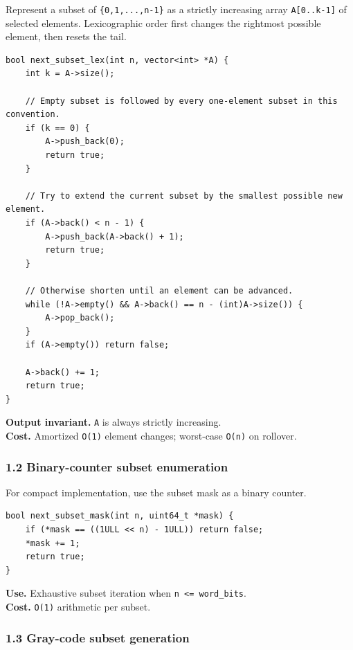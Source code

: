 \documentclass[11pt]{article}
\begin{document}
Represent a subset of \texttt{\{0,1,...,n-1\}} as a strictly increasing array \texttt{A[0..k-1]} of selected elements. Lexicographic order first changes the rightmost possible element, then resets the tail.

\begin{verbatim}
bool next_subset_lex(int n, vector<int> *A) {
    int k = A->size();

    // Empty subset is followed by every one-element subset in this convention.
    if (k == 0) {
        A->push_back(0);
        return true;
    }

    // Try to extend the current subset by the smallest possible new element.
    if (A->back() < n - 1) {
        A->push_back(A->back() + 1);
        return true;
    }

    // Otherwise shorten until an element can be advanced.
    while (!A->empty() && A->back() == n - (int)A->size()) {
        A->pop_back();
    }
    if (A->empty()) return false;

    A->back() += 1;
    return true;
}
\end{verbatim}

\textbf{Output invariant.} \texttt{A} is always strictly increasing.\\
\textbf{Cost.} Amortized \texttt{O(1)} element changes; worst-case \texttt{O(n)} on rollover.

\subsubsection{1.2 Binary-counter subset enumeration}\label{binary-counter-subset-enumeration}

For compact implementation, use the subset mask as a binary counter.

\begin{verbatim}
bool next_subset_mask(int n, uint64_t *mask) {
    if (*mask == ((1ULL << n) - 1ULL)) return false;
    *mask += 1;
    return true;
}
\end{verbatim}

\textbf{Use.} Exhaustive subset iteration when \texttt{n <= word\_bits}.\\
\textbf{Cost.} \texttt{O(1)} arithmetic per subset.

\subsubsection{1.3 Gray-code subset generation}\label{gray-code-subset-generation}
\end{document}
